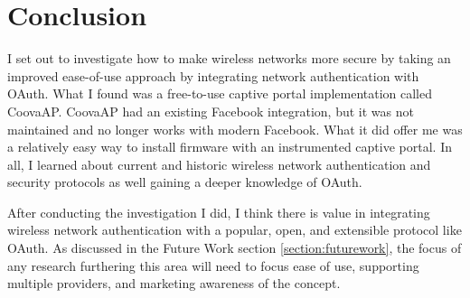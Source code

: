 \section{Conclusion}
\label{section:conclusion}
I set out to investigate how to make wireless networks more secure by taking an improved ease-of-use
approach by integrating network authentication with OAuth. What I found was a free-to-use captive
portal implementation called CoovaAP. CoovaAP had an existing Facebook integration, but it was not
maintained and no longer works with modern Facebook. What it did offer me was a relatively easy way
to install firmware with an instrumented captive portal. In all, I learned about current and
historic wireless network authentication and security protocols as well gaining a deeper knowledge
of OAuth.

After conducting the investigation I did, I think there is value in integrating wireless network
authentication with a popular, open, and extensible protocol like OAuth. As discussed in the Future
Work section \ref{section:futurework}, the focus of any research furthering this area will need to
focus ease of use, supporting multiple providers, and marketing awareness of the concept.